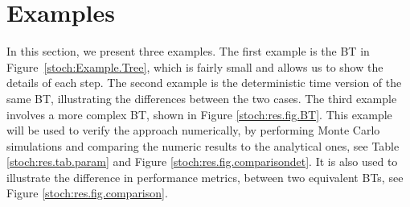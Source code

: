 \section{Examples}
\label{properties:sec:example:reliability}
In this section, we present three examples.
The first  example is the BT in Figure~\ref{stoch:Example.Tree}, which is fairly small and allows us to show the details of each step.
The second example is the deterministic time version of the same BT, illustrating the differences between the two cases.
The third example involves a more complex BT, shown in Figure \ref{stoch:res.fig.BT}.
This example will be used to verify the approach numerically, by performing Monte Carlo simulations and comparing the numeric results to the analytical ones, see Table \ref{stoch:res.tab.param} and Figure \ref{stoch:res.fig.comparisondet}. It is also used to illustrate the difference in performance metrics, between two equivalent BTs, see Figure \ref{stoch:res.fig.comparison}.


